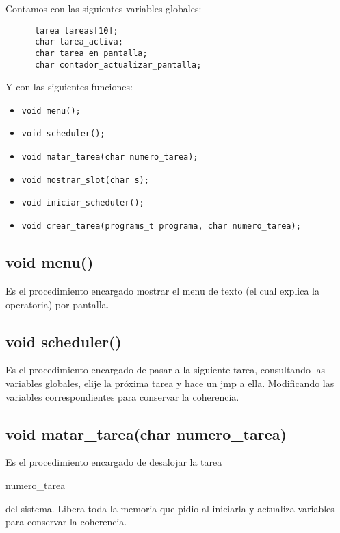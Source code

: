 \documentclass[a4paper,10pt]{article}
\begin{document}
Contamos con las siguientes variables globales:

\begin{verbatim}
      tarea tareas[10];
      char tarea_activa;	
      char tarea_en_pantalla;
      char contador_actualizar_pantalla;
\end{verbatim}


Y con las siguientes funciones:

\begin{itemize}
\item \begin{verbatim}void menu(); \end{verbatim}
\item \begin{verbatim}void scheduler();\end{verbatim}
\item \begin{verbatim}void matar_tarea(char numero_tarea);\end{verbatim}
\item \begin{verbatim}void mostrar_slot(char s);\end{verbatim}
\item \begin{verbatim}void iniciar_scheduler();\end{verbatim}
\item \begin{verbatim}void crear_tarea(programs_t programa, char numero_tarea);\end{verbatim}
\end{itemize}

\subsection*{ void menu()}
Es el procedimiento encargado mostrar el menu de texto (el cual explica la operatoria) por pantalla.

\subsection*{ void scheduler()}
Es el procedimiento encargado de pasar a la siguiente tarea, consultando las variables globales, elije la próxima tarea y hace un jmp a ella. Modificando las variables correspondientes para conservar la coherencia.

\subsection*{ void matar\_tarea(char numero\_tarea) }
Es el procedimiento encargado de desalojar la tarea \begin{it}numero\_tarea\end{it} del sistema. Libera toda la memoria que pidio al iniciarla y actualiza variables para conservar la coherencia.
\end{document}

